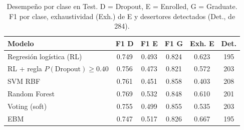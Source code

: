 \begin{table}[t]
\caption{Desempeño por clase en Test. D = Dropout, E = Enrolled, G = Graduate. F1 por clase, exhaustividad (Exh.) de E y desertores detectados (Det., de 284).}
\label{tab:clases}
\centering\scriptsize
\setlength{\tabcolsep}{3pt}
\begin{tabular}{@{}>{\raggedright\arraybackslash}p{2.55cm}ccccc@{}}
\toprule
Modelo & F1 D & F1 E & F1 G & Exh. E & Det. \\
\midrule
Regresión logística (RL) & 0.749 & 0.493 & 0.824 & 0.623 & 195 \\
RL + regla $P(\mathrm{Dropout})\geq0.40$ & 0.756 & 0.473 & 0.821 & 0.572 & 203 \\
SVM RBF & 0.761 & 0.451 & 0.858 & 0.403 & 208 \\
Random Forest & 0.769 & 0.532 & 0.848 & 0.610 & 201 \\
Voting (soft) & 0.755 & 0.499 & 0.855 & 0.535 & 203 \\
EBM & 0.747 & 0.517 & 0.826 & 0.667 & 195 \\
\bottomrule
\end{tabular}
\end{table}

